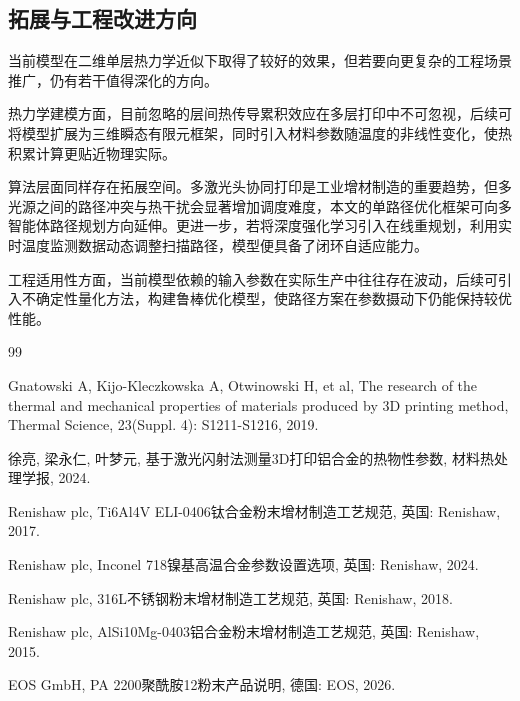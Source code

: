 \documentclass[a4paper, 12pt]{ctexart}
\begin{document}
\subsection{拓展与工程改进方向}
当前模型在二维单层热力学近似下取得了较好的效果，但若要向更复杂的工程场景推广，仍有若干值得深化的方向。

热力学建模方面，目前忽略的层间热传导累积效应在多层打印中不可忽视，后续可将模型扩展为三维瞬态有限元框架，同时引入材料参数随温度的非线性变化，使热积累计算更贴近物理实际。

算法层面同样存在拓展空间。多激光头协同打印是工业增材制造的重要趋势，但多光源之间的路径冲突与热干扰会显著增加调度难度，本文的单路径优化框架可向多智能体路径规划方向延伸。更进一步，若将深度强化学习引入在线重规划，利用实时温度监测数据动态调整扫描路径，模型便具备了闭环自适应能力。

工程适用性方面，当前模型依赖的输入参数在实际生产中往往存在波动，后续可引入不确定性量化方法，构建鲁棒优化模型，使路径方案在参数摄动下仍能保持较优性能。



\newpage
{}
{}
\begin{thebibliography}{99}
    
     Gnatowski A, Kijo-Kleczkowska A, Otwinowski H, et al, The research of the thermal and mechanical properties of materials produced by 3D printing method, Thermal Science, 23(Suppl. 4): S1211-S1216, 2019.
    
     徐亮, 梁永仁, 叶梦元, 基于激光闪射法测量3D打印铝合金的热物性参数, 材料热处理学报, 2024.
    
     Renishaw plc, Ti6Al4V ELI-0406钛合金粉末增材制造工艺规范, 英国: Renishaw, 2017.
    
     Renishaw plc, Inconel 718镍基高温合金参数设置选项, 英国: Renishaw, 2024. 
    
     Renishaw plc, 316L不锈钢粉末增材制造工艺规范, 英国: Renishaw, 2018. 
    
     Renishaw plc, AlSi10Mg-0403铝合金粉末增材制造工艺规范, 英国: Renishaw, 2015.
    
     EOS GmbH, PA 2200聚酰胺12粉末产品说明, 德国: EOS, 2026.

\end{thebibliography}

\newpage
\end{document}
